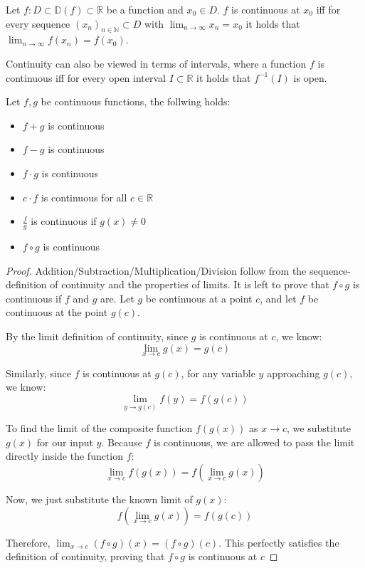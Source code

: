 \begin{theorem}
    Let $f: D \subset \mathbb{D}(f) \subset \mathbb{R}$ be a function and $x_0 \in D$. $f$ is continuous at $x_0$ iff for every sequence $(x_n)_{n\in\mathbb{N}} \subset D$ with $\lim_{n\to\infty} x_n = x_0$ it holds that $\lim_{n\to\infty} f(x_n) = f(x_0)$.
\end{theorem}

\begin{remark}
    Continuity can also be viewed in terms of intervals, where a function $f$ is continuous iff for every open interval $I \subset \mathbb{R}$ it holds that $f^{-1}(I)$ is open.
\end{remark}

\begin{lemma}
    Let $f, g$ be continuous functions, the follwing holds:
    \begin{itemize}
        \item $f+g$ is continuous
        \item $f-g$ is continuous
        \item $f \cdot g$ is continuous
        \item $c \cdot f$ is continuous for all $c \in \mathbb{R}$
        \item $\frac{f}{g}$ is continuous if $g(x) \neq 0$
        \item $f \circ g$ is continuous
    \end{itemize}
\end{lemma}

\begin{proof}
    Addition/Subtraction/Multiplication/Division follow from the sequence-definition of continuity and the properties of limits. It is left to prove that $f \circ g$ is continuous if $f$ and $g$ are.
    Let $g$ be continuous at a point $c$, and let $f$ be continuous at the point $g(c)$. 

    By the limit definition of continuity, since $g$ is continuous at $c$, we know:
    $$ \lim_{x \to c} g(x) = g(c) $$

    Similarly, since $f$ is continuous at $g(c)$, for any variable $y$ approaching $g(c)$, we know:
    $$ \lim_{y \to g(c)} f(y) = f(g(c)) $$

    To find the limit of the composite function $f(g(x))$ as $x \to c$, we substitute $g(x)$ for our input $y$. Because $f$ is continuous, we are allowed to pass the limit directly inside the function $f$:
    $$ \lim_{x \to c} f(g(x)) = f\left( \lim_{x \to c} g(x) \right) $$

    Now, we just substitute the known limit of $g(x)$:
    $$ f\left( \lim_{x \to c} g(x) \right) = f(g(c)) $$

    Therefore, $\lim_{x \to c} (f \circ g)(x) = (f \circ g)(c)$. This perfectly satisfies the definition of continuity, proving that $f \circ g$ is continuous at $c$
\end{proof}

